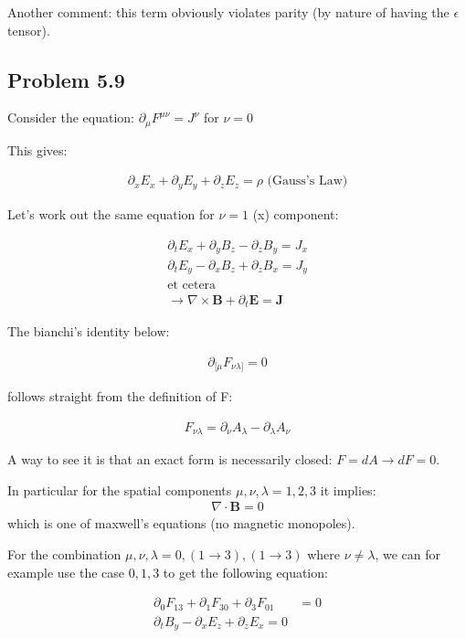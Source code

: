 \documentclass[11pt]{article}
\theoremstyle{definition}
\begin{document}
Another comment: this term obviously violates parity (by nature of having the $\epsilon$ tensor). 

\subsection{Problem 5.9}

Consider the equation:
$ \partial_{\mu} F^{\mu \nu} = J^{\nu}$ for $\nu = 0$

This gives:

\begin{align}
\partial_{x} E_x + \partial_y E_y + \partial_z E_z = \rho \text{ (Gauss's Law)}
\end{align}

Let's work out the same equation for $\nu = 1$ (x) component:

\begin{align}
 \partial_t E_x + \partial_y B_z - \partial_z B_y = J_x \\
\partial_t E_y - \partial_x B_z + \partial_z B_x = J_y \\
\text{et cetera} \\
\rightarrow \nabla \times \mathbf{B} + \partial_t \mathbf{E}  = \mathbf{J}
\end{align}

The bianchi's identity below:

\begin{align}
\partial_{[\mu}F_{\nu \lambda]} = 0
\end{align}

follows straight from the definition of F:

\begin{align}
F_{\nu \lambda} = \partial_{\nu} A_{\lambda} - \partial_{\lambda} A_{\nu}
\end{align}

A way to see it is that an exact form is necessarily closed:
$F = d A \rightarrow dF = 0$.

In particular for the spatial components $\mu, \nu, \lambda = 1, 2, 3$ it implies:
\begin{align}
\nabla \cdot \mathbf{B} = 0
\end{align}
which is one of maxwell's equations (no magnetic monopoles).

For the combination $\mu, \nu, \lambda = 0, (1 \rightarrow 3), (1 \rightarrow 3)$ where $\nu \neq \lambda$, we can for example use the case $0, 1, 3$ to get the following equation:

\begin{align}
\partial_0 F_{13} + \partial_{1} F_{30} + \partial_3 F_{01} &= 0 \\
\partial_t B_y - \partial_x E_z + \partial_z E_x = 0 \\
\end{align}
\end{document}

